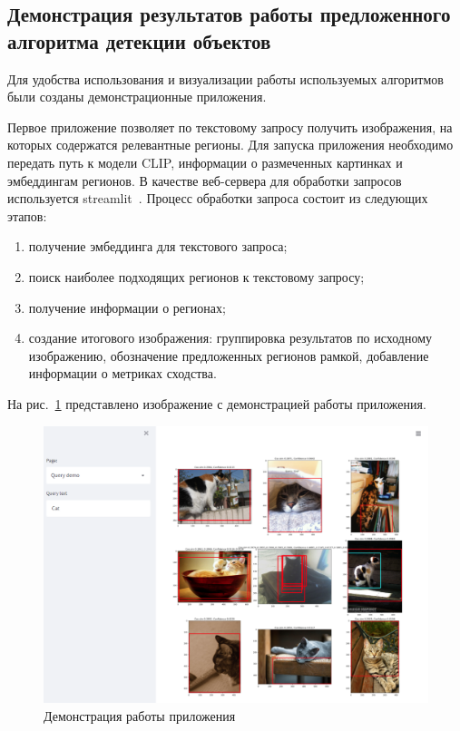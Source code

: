 \documentclass[a4paper,14pt]{article}
\begin{document}
    \subsection{Демонстрация результатов работы предложенного алгоритма детекции объектов}
    
    Для удобства использования и визуализации работы используемых алгоритмов были созданы демонстрационные приложения.
    
    Первое приложение позволяет по текстовому запросу получить изображения, на которых содержатся релевантные регионы.
    Для запуска приложения необходимо передать путь к модели CLIP, информации о размеченных картинках и эмбеддингам регионов.
	В качестве веб-сервера для обработки запросов используется streamlit~\cite{streamlit}.
	Процесс обработки запроса состоит из следующих этапов:
	\begin{enumerate}
		[1)]
		\itemsep0em
		\item получение эмбеддинга для текстового запроса;
		\item поиск наиболее подходящих регионов к текстовому запросу;
		\item получение информации о регионах;
		\item создание итогового изображения: группировка результатов по исходному изображению,
		 обозначение предложенных регионов рамкой, 
		 добавление информации о метриках сходства.
	\end{enumerate}
	
	На рис.~\ref{fig:demo_streamlit} представлено изображение с демонстрацией работы приложения.
	
    \begin{figure}[H]
    	\centering
    	\includegraphics[width=0.7\linewidth]{images/demo_streamlit}
    	\caption{Демонстрация работы приложения}
    	\label{fig:demo_streamlit}
    \end{figure}
    
\end{document}
